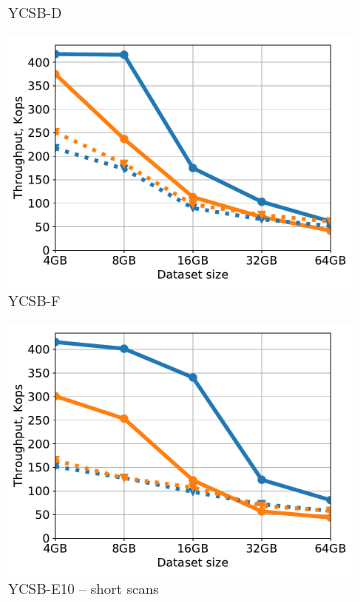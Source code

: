 \begin{figure}[tb]
\begin{subfigure}{0.33\linewidth}
\caption{YCSB-D}
\label{fig:throughput:d}
\end{subfigure}
\begin{subfigure}{0.33\linewidth}
\includegraphics[width=\textwidth]{figs/Workload_F_line.pdf}
\caption{YCSB-F}
\label{fig:throughput:f}
\end{subfigure}
\hspace{70pt}
\begin{subfigure}{0.33\linewidth}
\includegraphics[width=\textwidth]{figs/Workload_E-_line.pdf}
\caption{YCSB-E10 -- short scans}
\label{fig:throughput:e10}
\end{subfigure}
\begin{subfigure}{0.33\linewidth}

\end{subfigure}
\end{figure}
